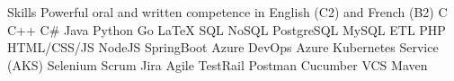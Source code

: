 
\begin{rubric}{Skills}
\entry*[Languages]
	 Powerful oral and written competence in English (C2) and French (B2)
C \textbullet{} C++ \textbullet{} C\# \textbullet{} Java \textbullet{} Python \textbullet{} Go \textbullet{} \LaTeX
{}
	SQL \textbullet{} NoSQL \textbullet{} PostgreSQL \textbullet{} MySQL \textbullet{} ETL
	PHP \textbullet{} HTML/CSS/JS \textbullet{} NodeJS \textbullet{} SpringBoot
	Azure DevOps \textbullet{} Azure Kubernetes Service (AKS)
\entry*[Tools]
	Selenium \textbullet{} Scrum \textbullet{} Jira \textbullet{} Agile \textbullet{} TestRail \textbullet{} Postman \textbullet{} Cucumber \textbullet{} VCS \textbullet{} Maven 

\end{rubric}
